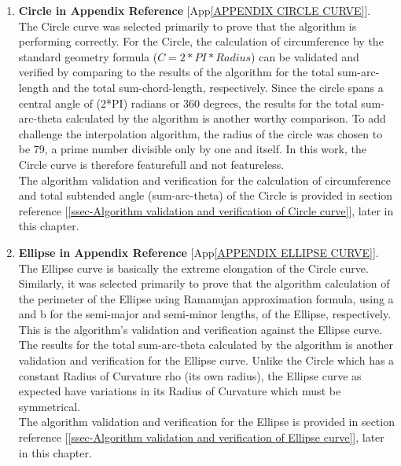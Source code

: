 \begin{enumerate}
	\item \textbf{Circle in Appendix Reference} [App\ref{APPENDIX CIRCLE CURVE}]. \\
	The Circle curve was selected primarily to prove that the algorithm is performing correctly. For the Circle, the calculation of circumference by the standard geometry formula ($C = 2*PI*Radius$) can be validated and verified by comparing to the results of the algorithm for the total sum-arc-length and the total sum-chord-length, respectively. Since the circle spans a central angle of (2*PI) radians or 360 degrees, the results for the total sum-arc-theta calculated by the algorithm is another worthy comparison. To add challenge the interpolation algorithm, the radius of the circle was chosen to be 79, a prime number divisible only by one and itself. In this work, the Circle curve is therefore featurefull and not featureless.\\
	
	The algorithm validation and verification for the calculation of circumference and total subtended angle (sum-arc-theta) of the Circle is provided in section reference [\ref{ssec-Algorithm validation and verification of Circle curve}], later in this chapter.\\
	
	\item \textbf{Ellipse in Appendix Reference} [App\ref{APPENDIX ELLIPSE CURVE}]. \\ 
	The Ellipse curve is basically the extreme elongation of the Circle curve. Similarly, it was selected primarily to prove that the algorithm calculation of the perimeter of the Ellipse using Ramanujan approximation formula, using a and b for the semi-major and semi-minor lengths, of the Ellipse, respectively. This is the algorithm's validation and verification against the Ellipse curve. The results for the total sum-arc-theta calculated by the algorithm is another validation and verification for the Ellipse curve. Unlike the Circle which has a constant Radius of Curvature rho (its own radius), the Ellipse curve as expected have variations in its Radius of Curvature which must be symmetrical.\\
	
	The algorithm validation and verification for the Ellipse is provided in section reference [\ref{ssec-Algorithm validation and verification of Ellipse curve}], later in this chapter.\\


\end{enumerate}
